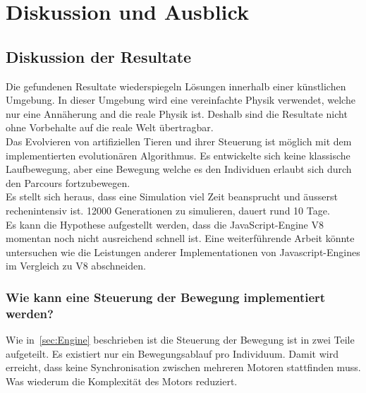 %
%


\chapter{Diskussion und Ausblick\label{chap:perspective}}


  \section{Diskussion der Resultate\label{sec:diskRes}}

    Die gefundenen Resultate wiederspiegeln Lösungen innerhalb einer künstlichen Umgebung.
    In dieser Umgebung wird eine vereinfachte Physik verwendet, welche nur eine Annäherung and die reale Physik ist.
    Deshalb sind die Resultate nicht ohne Vorbehalte auf die reale Welt übertragbar.
    \\
    Das Evolvieren von artifiziellen Tieren und ihrer Steuerung ist möglich
    mit dem implementierten evolutionären Algorithmus.
    Es entwickelte sich keine klassische Laufbewegung,
    aber eine Bewegung welche es den Individuen erlaubt sich durch den Parcours fortzubewegen.
    \\
    Es stellt sich heraus, dass eine Simulation viel Zeit beansprucht und äusserst rechenintensiv ist.
    12000 Generationen zu simulieren, dauert rund 10 Tage.
    \\
    Es kann die Hypothese aufgestellt werden, dass die JavaScript-Engine V8 momentan noch nicht ausreichend schnell ist.
    Eine weiterführende Arbeit könnte untersuchen wie die Leistungen anderer Implementationen von Javascript-Engines im
    Vergleich zu V8 abschneiden.

    \subsection{Wie kann eine Steuerung der Bewegung implementiert werden?}

      Wie in~\vref{sec:Engine} beschrieben ist die Steuerung der Bewegung ist in zwei Teile aufgeteilt.
      Es existiert nur ein Bewegungsablauf pro Individuum.
      Damit wird erreicht, dass keine Synchronisation zwischen mehreren Motoren stattfinden muss.
      Was wiederum die Komplexität des Motors reduziert.

